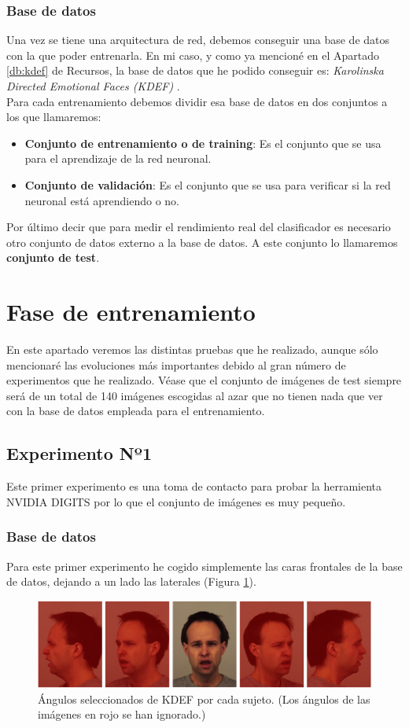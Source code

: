 \documentclass[a4paper,11pt]{book}
\begin{document}
\subsubsection{Base de datos}
Una vez se tiene una arquitectura de red, debemos conseguir una base de datos con la que poder entrenarla. En mi caso, y como ya mencioné en el Apartado \ref{db:kdef} de Recursos, la base de datos que he podido conseguir es: \textit{Karolinska Directed Emotional Faces (KDEF)} \cite{kdef98}.\\
Para cada entrenamiento debemos dividir esa base de datos en dos conjuntos a los que llamaremos:
\begin{itemize}
	\item \textbf{Conjunto de entrenamiento o de training}: Es el conjunto que se usa para el aprendizaje de la red neuronal. 
	\item \textbf{Conjunto de validación}: Es el conjunto que se usa para verificar si la red neuronal está aprendiendo o no.
\end{itemize}
Por último decir que para medir el rendimiento real del clasificador es necesario otro conjunto de datos externo a la base de datos. A este conjunto lo llamaremos \textbf{conjunto de test}.

\section{Fase de entrenamiento}
En este apartado veremos las distintas pruebas que he realizado, aunque sólo mencionaré las evoluciones más importantes debido al gran número de experimentos que he realizado. Véase que el conjunto de imágenes de test siempre será de un total de 140 imágenes escogidas al azar que no tienen nada que ver con la base de datos empleada para el entrenamiento.
\subsection{Experimento Nº1}\label{sub:entrenamiento1}
Este primer experimento es una toma de contacto para probar la herramienta NVIDIA DIGITS por lo que el conjunto de imágenes es muy pequeño.
\subsubsection{Base de datos}
Para este primer experimento he cogido simplemente las caras frontales de la base de datos, dejando a un lado las laterales (Figura \ref{fig:primerIntentoDBangles}).
\begin{figure}[h]
\centering
\includegraphics[width=0.7\linewidth]{imagenes/primerIntentoDBangles}
\caption[KDEF primer experimento]{Ángulos seleccionados de KDEF por cada sujeto. (Los ángulos de las imágenes en rojo se han ignorado.)}
\label{fig:primerIntentoDBangles}
\end{figure}
\end{document}
